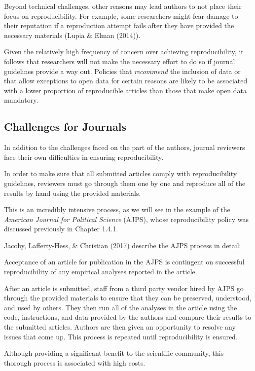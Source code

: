 \documentclass[12pt,twoside]{reedthesis}
\begin{document}
Beyond technical challenges, other reasons may lead authors to not place their focus on reproducibility. For example, some researchers might fear damage to their reputation if a reproduction attempt fails after they have provided the necessary materials (Lupia \& Elman (2014)).

Given the relatively high frequency of concern over achieving reproducibility, it follows that researchers will not make the necessary effort to do so if journal guidelines provide a way out. Policies that \emph{recommend} the inclusion of data or that allow exceptions to open data for certain reasons are likely to be associated with a lower proportion of reproducible articles than those that make open data mandatory.

\hypertarget{challenges-for-journals}{%
\subsection{Challenges for Journals}\label{challenges-for-journals}}

In addition to the challenges faced on the part of the authors, journal reviewers face their own difficulties in ensuring reproducibility.

In order to make sure that all submitted articles comply with reproducibility guidelines, reviewers must go through them one by one and reproduce all of the results by hand using the provided materials.

This is an incredibly intensive process, as we will see in the example of the \emph{American Journal for Political Science} (AJPS), whose reproducibility policy was discussed previously in Chapter 1.4.1.

Jacoby, Lafferty-Hess, \& Christian (2017) describe the AJPS process in detail:

Acceptance of an article for publication in the AJPS is contingent on successful reproducibility of any empirical analyses reported in the article.

After an article is submitted, staff from a third party vendor hired by AJPS go through the provided materials to ensure that they can be preserved, understood, and used by others. They then run all of the analyses in the article using the code, instructions, and data provided by the authors and compare their results to the submitted articles. Authors are then given an opportunity to resolve any issues that come up. This process is repeated until reproducibility is ensured.

Although providing a significant benefit to the scientific community, this thorough process is associated with high costs.
\end{document}
